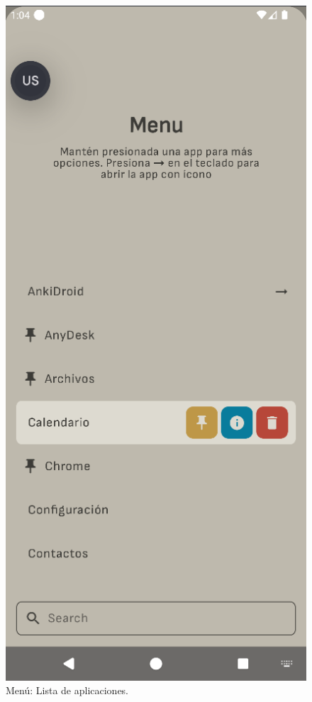 \pagebreak

\begin{figure}[ht!]
  \centering
  \captionsetup{justification=centering}
  \begin{minipage}{0.43\textwidth}
    \caption{Menú: Lista de aplicaciones.}
    \label{fig:menu_lista_aplicaciones}
    \centering
    \includegraphics[width=\textwidth]{Figuras/secciones/menu_lista_aplicaciones.png}

\end{minipage}
\end{figure}
